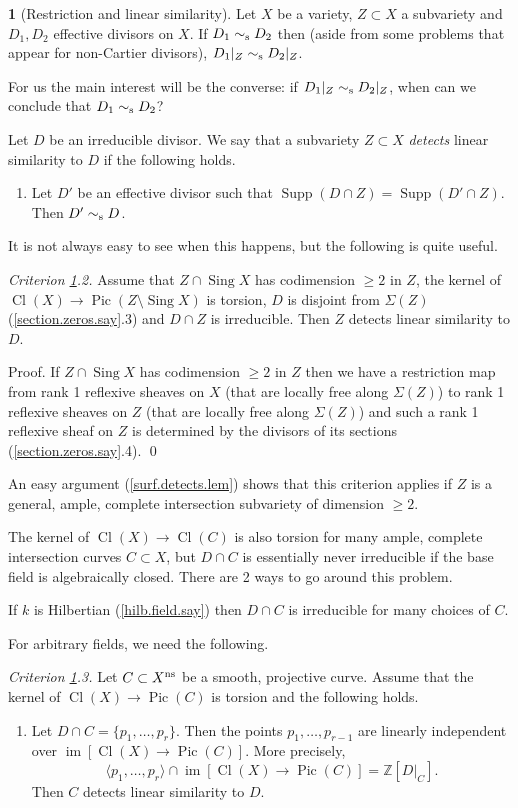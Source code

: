 \documentclass{amsart}
\theoremstyle{definition}
\newtheorem{say}[thm]{}
\theoremstyle{remark}
\newcommand{\z}[0]{{\mathbb Z}}
\newcommand{\pic}[0]{\operatorname{Pic}}
\newcommand{\supp}[0]{\operatorname{Supp}}
\newcommand{\im}[0]{\operatorname{im}}
\newcommand{\sing}[0]{\operatorname{Sing}}
\newcommand{\cl}[0]{\operatorname{Cl}}
\newcommand{\sims}[0]{\sim_{\rm s}}
\begin{document}
\begin{say}[Restriction and linear similarity]\label{rest.linsim.say}
Let $X$ be a variety,  $Z\subset X$ a subvariety and 
$D_1, D_2$  effective divisors on $X$. If $D_1\sims D_2$ then
(aside from some problems that appear for non-Cartier divisors),
   $D_1|_Z\sims D_2|_Z$.

For us the main interest will be the converse: if $D_1|_Z\sims D_2|_Z$, when can we conclude that $D_1\sims D_2$?

Let $D$ be an irreducible divisor. We say that a  subvariety  $Z\subset X$
{\it detects}  linear similarity to $D$ if the following holds.
\begin{enumerate}
\item Let $D'$ be an effective divisor such that $\supp (D\cap Z)=\supp (D'\cap Z)$. Then $D'\sims D$.
\end{enumerate}
It is not always easy to see when this happens, but the following is quite useful.
\medskip

{\it Criterion \ref{rest.linsim.say}.2.}  Assume that $Z\cap \sing X$ has codimension $\geq 2$ in  $Z$, the kernel of $\cl(X)\to \pic(Z\setminus \sing X)$ is torsion, $D$ is disjoint from $\Sigma(Z)$ (\ref{section.zeros.say}.3) and $D\cap Z$ is irreducible. Then $Z$ detects  linear similarity to $D$.
\medskip

Proof.  If $Z\cap \sing X$ has codimension $\geq 2$ in  $Z$ then 
we have a restriction map from rank 1 reflexive sheaves on $X$ (that are 
locally free along  $\Sigma(Z)$) to rank 1 reflexive sheaves on $Z$ (that are 
locally free along  $\Sigma(Z)$) and  such a rank 1 reflexive sheaf on $Z$ is determined  by the divisors of its sections
   (\ref{section.zeros.say}.4). \qed
\medskip


 An easy argument (\ref{surf.detects.lem}) shows 
that this criterion applies  if  $Z$ is a general, ample,  complete  intersection subvariety of dimension $\geq 2$.

The  kernel of $\cl(X)\to \cl(C)$ is also torsion for many ample, complete  intersection curves $C\subset X$, but  $D\cap C$ is essentially never irreducible 
if the base field is algebraically closed.  There are 2 ways to go around this problem. 

If $k$ is  Hilbertian
(\ref{hilb.field.say}) then   $D\cap C$ is irreducible for many choices of $C$.

For arbitrary fields, we need the following.
\medskip

{\it Criterion \ref{rest.linsim.say}.3.}  Let $C\subset X^{\rm ns}$ be a smooth, projective curve.
Assume that the kernel of $\cl(X)\to \pic(C)$ is torsion and the following holds.
\begin{enumerate}
\item[(a)] Let $D\cap C=\{p_1,\dots, p_r\}$. Then the points  $p_1,\dots, p_{r-1}$ are linearly independent over
$ \im [\cl(X)\to \pic(C)]$. More precisely, 
$$
\langle p_1,\dots, p_r\rangle\cap  \im [\cl(X)\to \pic(C)] =\z[D|_C].
$$
 Then $C$ detects  linear similarity to $D$.
\end{enumerate}
\medskip


\end{say}
\end{document}
